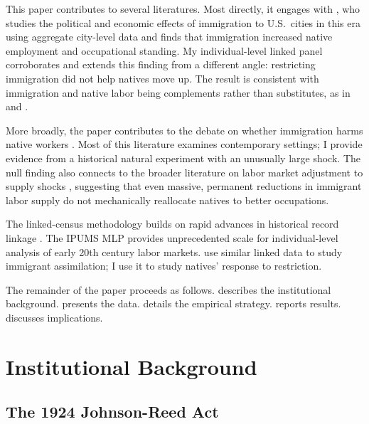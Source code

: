 \documentclass[12pt]{article}
\begin{document}
This paper contributes to several literatures.  Most directly, it engages with \citet{tabellini2020gifts}, who studies the political and economic effects of immigration to U.S.\ cities in this era using aggregate city-level data and finds that immigration increased native employment and occupational standing.  My individual-level linked panel corroborates and extends this finding from a different angle: restricting immigration did not help natives move up.  The result is consistent with immigration and native labor being complements rather than substitutes, as in \citet{peri2009effect} and \citet{ottaviano2012rethinking}.

More broadly, the paper contributes to the debate on whether immigration harms native workers \citep{borjas2003labor, card2005new, dustmann2013effect, clemens2018immigration}.  Most of this literature examines contemporary settings; I provide evidence from a historical natural experiment with an unusually large shock.  The null finding also connects to the broader literature on labor market adjustment to supply shocks \citep{card1990impact, friedberg2001impact, borjas2017wage}, suggesting that even massive, permanent reductions in immigrant labor supply do not mechanically reallocate natives to better occupations.

The linked-census methodology builds on rapid advances in historical record linkage \citep{abramitzky2012europe, abramitzky2014nation, abramitzky2021automated, bailey2017modern}.  The IPUMS MLP provides unprecedented scale for individual-level analysis of early 20th century labor markets.  \citet{abramitzky2019intergenerational} use similar linked data to study immigrant assimilation; I use it to study natives' response to restriction.

The remainder of the paper proceeds as follows.   describes the institutional background.   presents the data.   details the empirical strategy.   reports results.   discusses implications.

\section{Institutional Background}
\label{sec:background}

\subsection{The 1924 Johnson-Reed Act}
\end{document}
